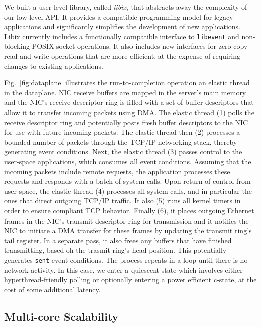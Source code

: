 We built a user-level library, called \emph{libix}, that abstracts
away the complexity of our low-level API. It provides a compatible
programming model for legacy applications and significantly simplifies
the development of new applications. Libix currently includes a
functionally compatible interface to \texttt{libevent} and
non-blocking POSIX socket operations. It also includes new interfaces
for zero copy read and write operations that are more efficient, at
the expense of requiring changes to existing applications.


% 

Fig.~\ref{fig:dataplane} illustrates the run-to-completion operation
an elastic thread in the \ix dataplane. NIC receive buffers are mapped
in the server's main memory and the NIC's receive descriptor ring is
filled with a set of buffer descriptors that allow it to transfer
incoming packets using DMA\@.  The elastic thread (1) polls the
receive descriptor ring and potentially posts fresh buffer descriptors
to the NIC for use with future incoming packets. The elastic thread
then (2) processes a bounded number of packets through the TCP/IP
networking stack, thereby generating event conditions. Next, the
elastic thread (3) passes control to the user-space applications,
which consumes all event conditions. Assuming that the incoming
packets include remote requests, the application processes these
requests and responds with a batch of system calls. Upon return of
control from user-space, the elastic thread (4) processes all system
calls, and in particular the ones that direct outgoing TCP/IP
traffic. It also (5) runs all kernel timers in order to ensure
compliant TCP behavior. Finally (6), it places outgoing Ethernet
frames in the NIC's transmit descriptor ring for transmission and it
notifies the NIC to initiate a DMA transfer for these frames by
updating the transmit ring's tail register. In a separate pass, it
also frees any buffers that have finished transmitting, based oh the
trasmit ring's head position. This potentially generates \texttt{sent}
event conditions.  The process repeats in a loop until there is no
network activity. In this case, we enter a quiescent state which
involves either hyperthread-friendly polling or optionally entering a
power efficient c-state, at the cost of some additional latency.


\subsection{Multi-core Scalability}
\label{sec:impl:cohfree}

